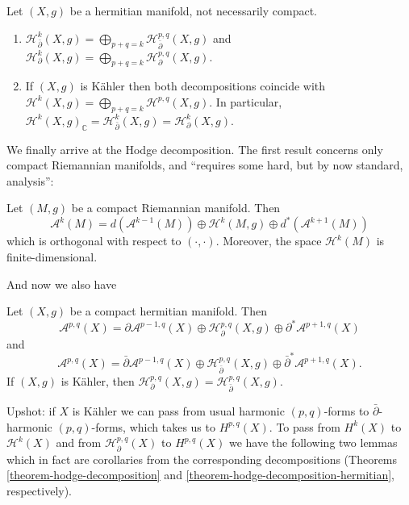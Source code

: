 \documentclass{book}
\begin{document}
\begin{proposition}
\label{proposition-decom-harmo-forms}
Let $(X,g)$ be a hermitian manifold, not
necessarily compact.
\begin{enumerate}
\item $\mathcal{H}^{k}_{\bar\partial}(X,g)
=\bigoplus_{p+q=k}\mathcal{H}^{p,q}
_{\bar\partial}(X,g)$
and
$\mathcal{H}^{k}_\partial(X,g)
=\bigoplus_{p+q=k}\mathcal{H}^{p,q}
_\partial(X,g)$.

\item If $(X,g)$ is Kähler then both
decompositions coincide with
$\mathcal{H}^{k}(X,g)
=\bigoplus_{p+q=k}\mathcal{H}^{p,q}(X,g)$.
In particular,
$\mathcal{H}^k(X,g)_{\mathbb{C}}
=\mathcal{H}^k_{\bar\partial}(X,g)
=\mathcal{H}^k_{\partial}(X,g)$.
\end{enumerate}
\end{proposition}

\noindent
We finally arrive at the Hodge decomposition.
The first result concerns only compact
Riemannian manifolds,
and ``requires some hard, but by now
standard, analysis'':

\begin{theorem}
\label{theorem-hodge-decomposition}
Let $(M,g)$ be a compact Riemannian manifold.
Then
$$
\mathcal{A}^k(M) =
d(\mathcal{A}^{k-1}(M))
\oplus
\mathcal{H}^k(M,g)
\oplus
d^* (\mathcal{A}^{k+1}(M))
$$
which is orthogonal with respect to
$(\cdot,\cdot)$.
Moreover, the space $\mathcal{H}^k(M)$ is
finite-dimensional.
\end{theorem}

\noindent
And now we also have
\begin{theorem}
\label{theorem-hodge-decomposition-hermitian}
Let $(X,g)$ be a compact hermitian manifold.
Then
$$
\mathcal{A}^{p,q}(X)=
\partial\mathcal{A}^{p-1,q}(X)
\oplus
\mathcal{H}^{p,q}_\partial(X,g)
\oplus
\partial^*\mathcal{A}^{p+1,q}(X)
$$
and
$$
\mathcal{A}^{p,q}(X)=
\bar\partial\mathcal{A}^{p-1,q}(X)
\oplus
\mathcal{H}^{p,q}_{\bar\partial}(X,g)
\oplus
\bar\partial^*\mathcal{A}^{p+1,q}(X).
$$
If $(X,g)$ is Kähler, then
$\mathcal{H}^{p,q}_\partial(X,g)=\mathcal{H}
^{p,q}_{\bar\partial}(X,g)$.
\end{theorem}

\noindent
Upshot: if $X$ is Kähler we can pass from
usual
harmonic $(p,q)$-forms to
$\bar\partial$-harmonic $(p,q)$-forms,
which takes us to $H^{p,q}(X)$.
To pass from $H^k(X)$ to $\mathcal{H}^k(X)$
and from
$\mathcal{H}^{p,q}_{\partial}(X)$ to
$H^{p,q}(X)$
we have the following two lemmas
which in fact are corollaries from the
corresponding decompositions
(Theorems \ref{theorem-hodge-decomposition}
and
\ref{theorem-hodge-decomposition-hermitian},
respectively).
\end{document}
